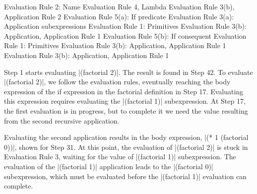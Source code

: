 \begin{schemeregion}
 {Evaluation Rule 2: Name}
	 {Evaluation Rule 4, Lambda}
	 {Evaluation Rule 3(b), Application Rule 2}
	 {Evaluation Rule 5(a): If predicate}
	 {Evaluation Rule 3(a): Application subexpressions}
	 {Evaluation Rule 1: Primitives}
	 {Evaluation Rule 3(b): Application, Application Rule 1}
	 {Evaluation Rule 5(b): If consequent}
    {Evaluation Rule 1: Primitives}
 {Evaluation Rule 3(b): Application, Application Rule 1}
 {Evaluation Rule 3(b): Application, Application Rule 1}
\evalend

Step 1 starts evaluating \scheme|(factorial 2)|.  The result is found in Step 42.  To evaluate \scheme|(factorial 2)|, we follow the evaluation rules, eventually reaching the body expression of the if expression in the factorial definition in Step 17.  Evaluating this expression requires evaluating the \scheme|(factorial 1)| subexpression.  At Step 17, the first evaluation is in progress, but to complete it we need the value resulting from the second recursive application.  

Evaluating the second application results in the body expression, \scheme|(* 1 (factorial 0))|, shown for Step 31.  At this point, the evaluation of \scheme|(factorial 2)| is stuck in Evaluation Rule 3, waiting for the value of \scheme|(factorial 1)| subexpression.  The evaluation of the \scheme|(factorial 1)| application leads to the \scheme|(factorial 0)| subexpression, which must be evaluated before the \scheme|(factorial 1)| evaluation can complete.  


\end{schemeregion}
